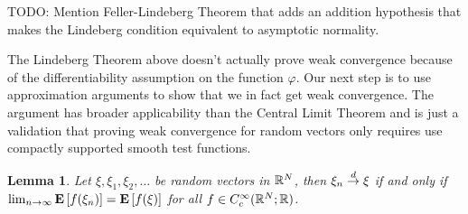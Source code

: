 \documentclass{amsart}
\newtheorem{lem}[thm]{Lemma}
\theoremstyle{remark}
\theoremstyle{definition}
\begin{document}
TODO: Mention Feller-Lindeberg Theorem that adds an addition
hypothesis that makes the Lindeberg condition equivalent to
asymptotic normality.

The Lindeberg Theorem above doesn't actually prove weak convergence
because of the differentiability assumption on the function $\varphi$.
Our next step is to use approximation arguments to show that we in
fact get weak convergence.  The argument has broader applicability
than the Central Limit Theorem and is just a validation that proving weak
convergence for random vectors only requires use compactly supported
smooth test functions.
\begin{lem}\label{WeakConvergenceWithSmoothTestFunctions}Let $\xi, \xi_1, \xi_2, \dots$ be random vectors in $\mathbb{R}^N$,
  then $\xi_n \overset{d}\to \xi$ if and only if $\lim_{n \to \infty}
  \textbf{E}\left[f(\xi_n)\right] = \textbf{E}\left[f(\xi)\right]$ for all $f \in
  C^\infty_c(\mathbb{R}^N; \mathbb{R})$.
\end{lem}
\end{document}
